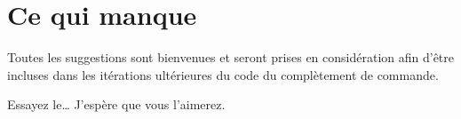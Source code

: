 \documentclass[11pt,french]{article}
\newcommand{\esckey}{\textsf{Esc}}
\newcommand{\shiftkey}{\textsf{Shift}}
\newcommand{\CCT}{\textsf{CommandCompletion.txt}}
\begin{document}

\enlargethispage*{1\baselineskip}
\section*{Ce qui manque}

Toutes les suggestions sont bienvenues et seront prises en considération afin d'être incluses dans les itérations 
ultérieures du code du complètement de commande. 

\vspace{5pt plus 2pt minus 1pt}\noindent
Essayez le… J'espère que vous l'aimerez.

%

\end{document}
